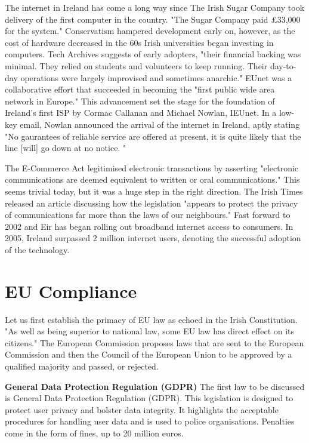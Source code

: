 The internet in Ireland has come a long way since The Irish Sugar Company took delivery of the first computer in the country. "The Sugar Company paid £33,000 for the system." \cite{irelands_first_computers} Conservatism hampered development early on, however, as the cost of hardware decreased in the 60s Irish universities began investing in computers. Tech Archives suggests of early adopters, "their financial backing was minimal. They relied on students and volunteers to keep running. Their day-to-day operations were largely improvised and sometimes anarchic." \cite{internet_ireland_1987_97} EUnet was a collaborative effort that succeeded in becoming the "first public wide area network in Europe." \cite{internet_ireland_1987_97} This advancement set the stage for the foundation of Ireland's first ISP by Cormac Callanan and Michael Nowlan, IEUnet. In a low-key email, Nowlan announced the arrival of the internet in Ireland, aptly stating "No gaurantees of reliable service are offered at present, it is quite likely that the line [will] go down at no notice. " \cite{tcd_scss_t_20160323_001} 

The E-Commerce Act legitimised electronic transactions by asserting "electronic communications are deemed equivalent to written or oral communications." \cite{electronic_documents_legalguide} This seems trivial today, but it was a huge step in the right direction. The Irish Times released an article discussing how the legislation "appears to protect the privacy of communications far more than the laws of our neighbours." \cite{irishtimes_privacy_legislation} 
Fast forward to 2002 and Eir has began rolling out broadband internet access to consumers. In 2005, Ireland surpassed 2 million internet users, denoting the successful adoption of the technology. 

\section{EU Compliance}
Let us first establish the primacy of EU law as echoed in the Irish Constitution. "As well as being superior to national law, some EU law has direct effect on its citizens." \cite{citizensinformation2025} The European Commission proposes laws that are sent to the European Commission and then the Council of the European Union to be approved by a qualified majority and passed, or rejected. \cite{europa2025} 

\textbf{General Data Protection Regulation (GDPR)}
The first law to be discussed is General Data Protection Regulation (GDPR). This legislation is designed to protect user privacy and bolster data integrity. It highlights the acceptable procedures for handling user data and is used to police organisations. Penalties come in the form of fines, up to 20 million euros. \cite{gdprinfo2025} 

